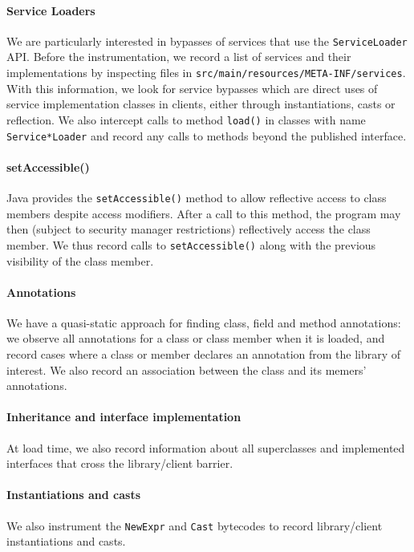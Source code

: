 \paragraph{Service Loaders} We are particularly interested in bypasses of 
services that use the \texttt{ServiceLoader} API. Before the instrumentation, we record a list 
of services and their implementations by inspecting files in \texttt{src/main/resources/META-INF/services}.
With this information, we look for service bypasses which are direct uses of service implementation 
classes in clients, either through instantiations, casts or reflection. We also intercept calls 
to method \texttt{load()} in classes with name \texttt{Service*Loader} and record any calls to methods beyond 
the published interface.

\paragraph{setAccessible()} 
Java provides the \texttt{setAccessible()} method to allow reflective access to class members despite
access modifiers. After a call to this method, the program may then (subject to security manager restrictions)
reflectively access the class member.
We thus record calls to \texttt{setAccessible()} along with the previous visibility of the class member.

\paragraph{Annotations} 
We have a quasi-static approach for finding class, field and method
annotations: we observe all annotations for a class or class member
when it is loaded, and record cases where a class or member declares an
annotation from the library of interest. We also record an association
between the class and its memers' annotations.

\paragraph{Inheritance and interface implementation} At load time,
we also record information about all superclasses and implemented interfaces
that cross the library/client barrier.

\paragraph{Instantiations and casts} We also instrument the
\texttt{NewExpr} and \texttt{Cast} bytecodes to record library/client 
instantiations and casts.



